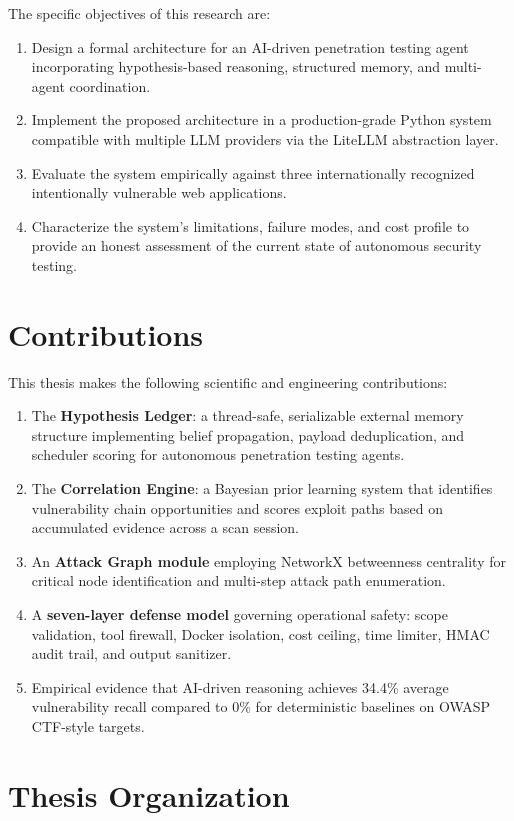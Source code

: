 \documentclass[12pt,a4paper,oneside,openany]{book}
\begin{document}
The specific objectives of this research are:
\begin{enumerate}
\item Design a formal architecture for an AI-driven penetration testing agent incorporating hypothesis-based reasoning, structured memory, and multi-agent coordination.
\item Implement the proposed architecture in a production-grade Python system compatible with multiple LLM providers via the LiteLLM abstraction layer.
\item Evaluate the system empirically against three internationally recognized intentionally vulnerable web applications.
\item Characterize the system's limitations, failure modes, and cost profile to provide an honest assessment of the current state of autonomous security testing.
\end{enumerate}

\section{Contributions}

This thesis makes the following scientific and engineering contributions:

\begin{enumerate}
\item The \textbf{Hypothesis Ledger}: a thread-safe, serializable external memory structure implementing belief propagation, payload deduplication, and scheduler scoring for autonomous penetration testing agents.
\item The \textbf{Correlation Engine}: a Bayesian prior learning system that identifies vulnerability chain opportunities and scores exploit paths based on accumulated evidence across a scan session.
\item An \textbf{Attack Graph module} employing NetworkX betweenness centrality for critical node identification and multi-step attack path enumeration.
\item A \textbf{seven-layer defense model} governing operational safety: scope validation, tool firewall, Docker isolation, cost ceiling, time limiter, HMAC audit trail, and output sanitizer.
\item Empirical evidence that AI-driven reasoning achieves 34.4\% average vulnerability recall compared to 0\% for deterministic baselines on OWASP CTF-style targets.
\end{enumerate}

\section{Thesis Organization}
\end{document}
